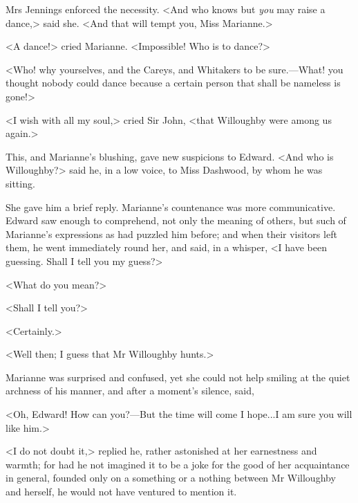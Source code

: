 Mrs Jennings enforced the necessity. <And who knows but \textit{you} may raise a dance,> said she. <And that will tempt you, Miss Marianne.>

<A dance!> cried Marianne. <Impossible! Who is to dance?>

<Who! why yourselves, and the Careys, and Whitakers to be sure.—What! you thought nobody could dance because a certain person that shall be nameless is gone!>

<I wish with all my soul,> cried Sir John, <that Willoughby were among us again.>

This, and Marianne's blushing, gave new suspicions to Edward. <And who is Willoughby?> said he, in a low voice, to Miss Dashwood, by whom he was sitting.

She gave him a brief reply. Marianne's countenance was more communicative. Edward saw enough to comprehend, not only the meaning of others, but such of Marianne's expressions as had puzzled him before; and when their visitors left them, he went immediately round her, and said, in a whisper, <I have been guessing. Shall I tell you my guess?>

<What do you mean?>

<Shall I tell you?>

<Certainly.>

<Well then; I guess that Mr Willoughby hunts.>

Marianne was surprised and confused, yet she could not help smiling at the quiet archness of his manner, and after a moment's silence, said,

<Oh, Edward! How can you?—But the time will come I hope...I am sure you will like him.>

<I do not doubt it,> replied he, rather astonished at her earnestness and warmth; for had he not imagined it to be a joke for the good of her acquaintance in general, founded only on a something or a nothing between Mr Willoughby and herself, he would not have ventured to mention it.